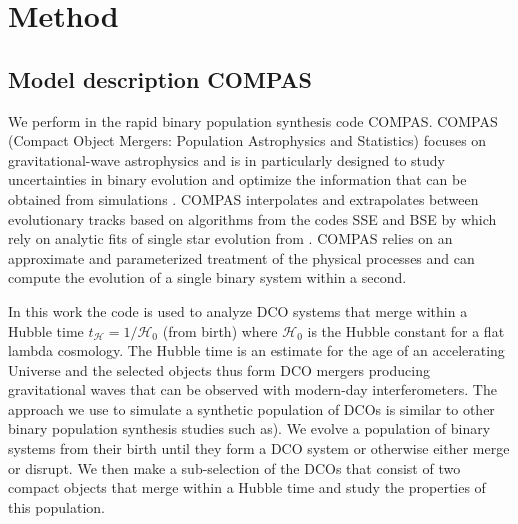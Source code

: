 \documentclass[a4paper,fleqn,usenatbib,useAMS,usedcolumn]{mnras}
\begin{document}
\section{Method}
\label{sec:method}

\subsection{Model description COMPAS}
\label{subsec:method-COMPASmodel}
We perform  in the rapid binary population synthesis code COMPAS. 
COMPAS (Compact Object Mergers: Population Astrophysics and Statistics) focuses on gravitational-wave astrophysics and is in particularly designed to study uncertainties in binary evolution and optimize the information that can be obtained from simulations \citep{stevenson2017formation, 2018MNRAS.477.4685B, vigna2018formation, NeijsselPrep}.  
COMPAS interpolates and extrapolates between evolutionary tracks based on algorithms from the codes SSE and BSE by \citet{hurley2000comprehensive,hurley2002evolution}  which rely on analytic fits of single star evolution from \citet{pols1998stellar}. COMPAS relies on an approximate and parameterized treatment of the physical processes and can  compute the evolution of a single binary system within a second.  

In this work the code is used to analyze DCO systems that merge within a Hubble time $t_{\mathcal{H}} = 1 / \mathcal{H}_0$ (from birth) where  $\mathcal{H}_0$ is the Hubble constant for a flat lambda cosmology. The Hubble time is an estimate for the age of an accelerating Universe and the selected objects thus form  DCO mergers producing gravitational waves that can be observed with modern-day interferometers. The approach we use to simulate a synthetic population of DCOs is similar to other binary population synthesis studies such as\citet{belczynski2002comprehensive,Dominik:2012kk}). We evolve a population of binary systems from their birth until they form a DCO system or otherwise either merge or disrupt. We then make a sub-selection of the DCOs that consist of two compact objects that merge within a Hubble time and study the properties of this population.  
\end{document}

